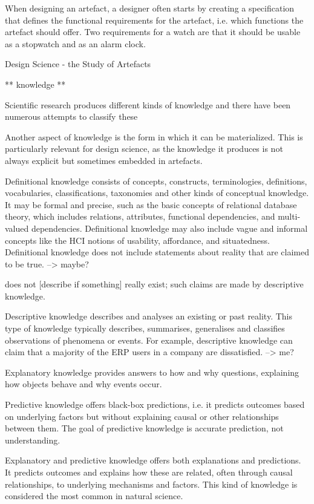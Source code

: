 When designing an artefact, a designer often starts by creating a
specification that defines the functional requirements for the artefact,
i.e. which functions the artefact should offer. Two requirements
for a watch are that it should be usable as a stopwatch and as an
alarm clock.

Design Science - the Study of Artefacts


** knowledge **

Scientific research produces different kinds of knowledge and there
have been numerous attempts to classify these

Another aspect of knowledge is the form in which it can be materialized.
This is particularly relevant for design science, as the
knowledge it produces is not always explicit but sometimes embedded
in artefacts.


Definitional knowledge consists of concepts, constructs, terminologies,
definitions, vocabularies, classifications, taxonomies and other
kinds of conceptual knowledge. It may be formal and precise, such as
the basic concepts of relational database theory, which includes relations,
attributes, functional dependencies, and multi-valued dependencies.
Definitional knowledge may also include vague and informal
concepts like the HCI notions of usability, affordance, and situatedness.
Definitional knowledge does not include statements about reality
that are claimed to be true. --> maybe?

does not [describe if something] really exist; such claims are made by descriptive knowledge.


Descriptive knowledge describes and analyses an existing or past
reality. This type of knowledge typically describes, summarises, generalises
and classifies observations of phenomena or events. For
example, descriptive knowledge can claim that a majority of the ERP
users in a company are dissatisfied. --> me?


Explanatory knowledge provides answers to how and why questions,
explaining how objects behave and why events occur.


Predictive knowledge offers black-box predictions, i.e. it predicts
outcomes based on underlying factors but without explaining causal
or other relationships between them. The goal of predictive
knowledge is accurate prediction, not understanding.


Explanatory and predictive knowledge offers both explanations and
predictions. It predicts outcomes and explains how these are related,
often through causal relationships, to underlying mechanisms and
factors. This kind of knowledge is considered the most common in
natural science.


